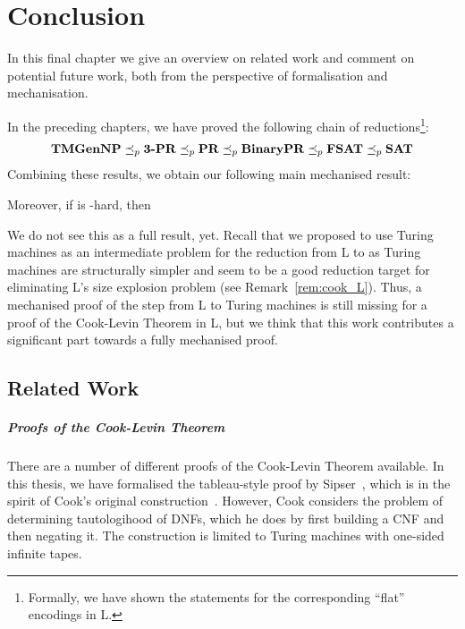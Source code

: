 \chapter{Conclusion}\label{chap:conclusion}
In this final chapter we give an overview on related work and comment on potential future work, both from the perspective of formalisation and mechanisation.

In the preceding chapters, we have proved the following chain of reductions\footnote{Formally, we have shown the statements for the corresponding ``flat'' encodings in L.}:
\begin{align*}
  \textbf{TMGenNP} \preceq_p{} \textbf{3-PR} \preceq_p{} \textbf{PR} \preceq_p{} \textbf{BinaryPR} \preceq_p{} \textbf{FSAT}{} \preceq_p{} \textbf{SAT}{} 
\end{align*}
Combining these results, we obtain our following main mechanised result:
\begin{theorem}
   Moreover, if \gennp{} is \NP{}-hard, then 
\end{theorem}
We do not see this as a full result, yet. Recall that we proposed to use Turing machines as an intermediate problem for the reduction from L to \SAT{} as Turing machines are structurally simpler and seem to be a good reduction target for eliminating L's size explosion problem (see Remark~\ref{rem:cook_L}).
Thus, a mechanised proof of the step from L to Turing machines is still missing for a proof of the Cook-Levin Theorem in L, but we think that this work contributes a significant part towards a fully mechanised proof.

\section{Related Work}
\paragraph{Proofs of the Cook-Levin Theorem}
There are a number of different proofs of the Cook-Levin Theorem available. In this thesis, we have formalised the tableau-style proof by Sipser~\cite[Chapter~7.4]{Sipser:TheoryofComputation}, which is in the spirit of Cook's original construction~\cite{cook_theorem}. However, Cook considers the problem of determining tautologihood of DNFs, which he does by first building a CNF and then negating it. The construction is limited to Turing machines with one-sided infinite tapes.

